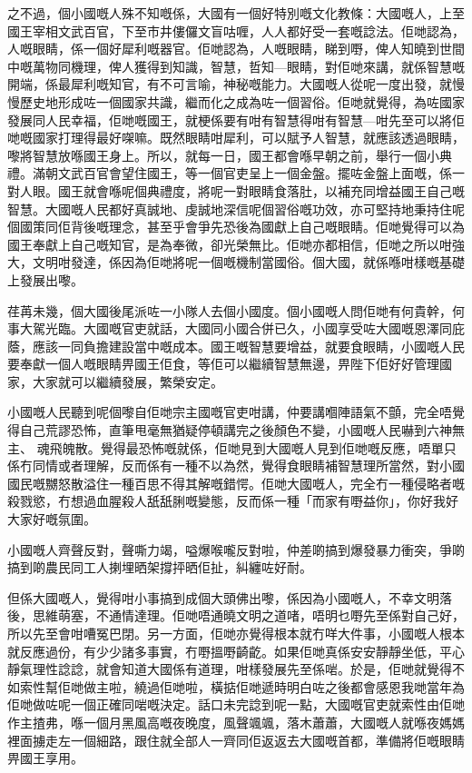 之不過，個小國嘅人殊不知嘅係，大國有一個好特別嘅文化教條：大國嘅人，上至國王宰相文武百官，下至市井僂儸文盲咕喱，人人都好受一套嘅諗法。佢哋認為，人嘅眼睛，係一個好犀利嘅器官。佢哋認為，人嘅眼睛，睇到嘢，俾人知曉到世間中嘅萬物同機理，俾人獲得到知識，智慧，哲知—眼睛，對佢哋來講，就係智慧嘅開端，係最犀利嘅知官，有不可言喻，神秘嘅能力。大國嘅人從呢一度出發，就慢慢歷史地形成咗一個國家共識，繼而化之成為咗一個習俗。佢哋就覺得，為咗國家發展同人民幸福，佢哋嘅國王，就梗係要有咁有智慧得咁有智慧—咁先至可以將佢哋嘅國家打理得最好㗎嘛。既然眼睛咁犀利，可以賦予人智慧，就應該透過眼睛，嚟將智慧放喺國王身上。所以，就每一日，國王都會喺早朝之前，舉行一個小典禮。滿朝文武百官會望住國王，等一個官吏呈上一個金盤。擺咗金盤上面嘅，係一對人眼。國王就會喺呢個典禮度，將呢一對眼睛食落肚，以補充同增益國王自己嘅智慧。大國嘅人民都好真誠地、虔誠地深信呢個習俗嘅功效，亦可堅持地秉持住呢個國策同佢背後嘅理念，甚至乎會爭先恐後為國獻上自己嘅眼睛。佢哋覺得可以為國王奉獻上自己嘅知官，是為奉微，卻光榮無比。佢哋亦都相信，佢哋之所以咁強大，文明咁發達，係因為佢哋將呢一個嘅機制當國俗。個大國，就係喺咁樣嘅基礎上發展出嚟。



荏苒未幾，個大國後尾派咗一小隊人去個小國度。個小國嘅人問佢哋有何貴幹，何事大駕光臨。大國嘅官吏就話，大國同小國合併已久，小國享受咗大國嘅恩澤同庇蔭，應該一同負擔建設當中嘅成本。國王嘅智慧要增益，就要食眼睛，小國嘅人民要奉獻一個人嘅眼睛畀國王佢食，等佢可以繼續智慧無邊，畀陛下佢好好管理國家，大家就可以繼續發展，繁榮安定。



小國嘅人民聽到呢個嚟自佢哋宗主國嘅官吏咁講，仲要講嗰陣語氣不顫，完全唔覺得自己荒謬恐怖，直筆甩毫無猶疑停頓講完之後顏色不變，小國嘅人民嚇到六神無主、 魂飛魄散。覺得最恐怖嘅就係，佢哋見到大國嘅人見到佢哋嘅反應，唔單只係冇同情或者理解，反而係有一種不以為然，覺得食眼睛補智慧理所當然，對小國國民嘅嬲怒散溢住一種百思不得其解嘅錯愕。佢哋大國嘅人，完全冇一種侵略者嘅殺戮慾，冇想過血腥殺人舐舐脷嘅變態，反而係一種「而家有嘢益你」，你好我好大家好嘅氛圍。



小國嘅人齊聲反對，聲嘶力竭，嗌爆喉嚨反對啦，仲差啲搞到爆發暴力衝突，爭啲搞到啲農民同工人揦埋晒架撐抨晒佢扯，糾纏咗好耐。



但係大國嘅人，覺得咁小事搞到成個大頭佛出嚟，係因為小國嘅人，不幸文明落後，思維萌塞，不通情達理。佢哋唔通曉文明之道啫，唔明乜嘢先至係對自己好，所以先至會咁嘈冤巴閉。另一方面，佢哋亦覺得根本就冇咩大件事，小國嘅人根本就反應過份，有少少諸多事實，冇嘢搵嘢齮齕。如果佢哋真係安安靜靜坐低，平心靜氣理性諗諗，就會知道大國係有道理，咁樣發展先至係啱。於是，佢哋就覺得不如索性幫佢哋做主啦，繞過佢哋啦，橫掂佢哋遞時明白咗之後都會感恩我哋當年為佢哋做咗呢一個正確同啱嘅決定。話口未完諗到呢一點，大國嘅官吏就索性由佢哋作主揸弗，喺一個月黑風高嘅夜晚度，風聲颯颯，落木蕭蕭，大國嘅人就喺夜媽媽裡面擄走左一個細路，跟住就全部人一齊同佢返返去大國嘅首都，準備將佢嘅眼睛畀國王享用。



